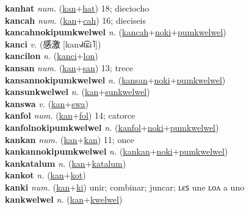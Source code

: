\textbf{kanhat} \textit{num.} (\hyperref[kan]{kan}+\hyperref[hat]{hat})
18; dieciocho \label{kanhat} \\
\textbf{kancah} \textit{num.} (\hyperref[kan]{kan}+\hyperref[cah]{cah})
16; dieciseis \label{kancah} \\
\textbf{kancahnokipumkwelwel} \textit{n.} (\hyperref[kancah]{kancah}+\hyperref[noki]{noki}+\hyperref[pumkwelwel]{pumkwelwel})
 \label{kancahnokipumkwelwel} \\
\textbf{kanci} \textit{v.} ({\chinese{}感激} [kan˧˩˧t͡ɕi˥])
 \label{kanci} \\
\textbf{kancilon} \textit{n.} (\hyperref[kanci]{kanci}+\hyperref[lon]{lon})
 \label{kancilon} \\
\textbf{kansan} \textit{num.} (\hyperref[kan]{kan}+\hyperref[san]{san})
13; trece \label{kansan} \\
\textbf{kansannokipumkwelwel} \textit{n.} (\hyperref[kansan]{kansan}+\hyperref[noki]{noki}+\hyperref[pumkwelwel]{pumkwelwel})
 \label{kansannokipumkwelwel} \\
\textbf{kansunkwelwel} \textit{n.} (\hyperref[kan]{kan}+\hyperref[sunkwelwel]{sunkwelwel})
 \label{kansunkwelwel} \\
\textbf{kanswa} \textit{v.} (\hyperref[kan]{kan}+\hyperref[swa]{swa})
 \label{kanswa} \\
\textbf{kanfol} \textit{num.} (\hyperref[kan]{kan}+\hyperref[fol]{fol})
14; catorce \label{kanfol} \\
\textbf{kanfolnokipumkwelwel} \textit{n.} (\hyperref[kanfol]{kanfol}+\hyperref[noki]{noki}+\hyperref[pumkwelwel]{pumkwelwel})
 \label{kanfolnokipumkwelwel} \\
\textbf{kankan} \textit{num.} (\hyperref[kan]{kan}+\hyperref[kan]{kan})
11; once \label{kankan} \\
\textbf{kankannokipumkwelwel} \textit{n.} (\hyperref[kankan]{kankan}+\hyperref[noki]{noki}+\hyperref[pumkwelwel]{pumkwelwel})
 \label{kankannokipumkwelwel} \\
\textbf{kankatalum} \textit{n.} (\hyperref[kan]{kan}+\hyperref[katalum]{katalum})
 \label{kankatalum} \\
\textbf{kankot} \textit{n.} (\hyperref[kan]{kan}+\hyperref[kot]{kot})
 \label{kankot} \\
\textbf{kanki} \textit{num.} (\hyperref[kan]{kan}+\hyperref[ki]{ki})
unir; combinar; juncar; ʟєꜱ une ʟᴏᴧ a uno \label{kanki} \\
\textbf{kankwelwel} \textit{n.} (\hyperref[kan]{kan}+\hyperref[kwelwel]{kwelwel})
 \label{kankwelwel} \\
